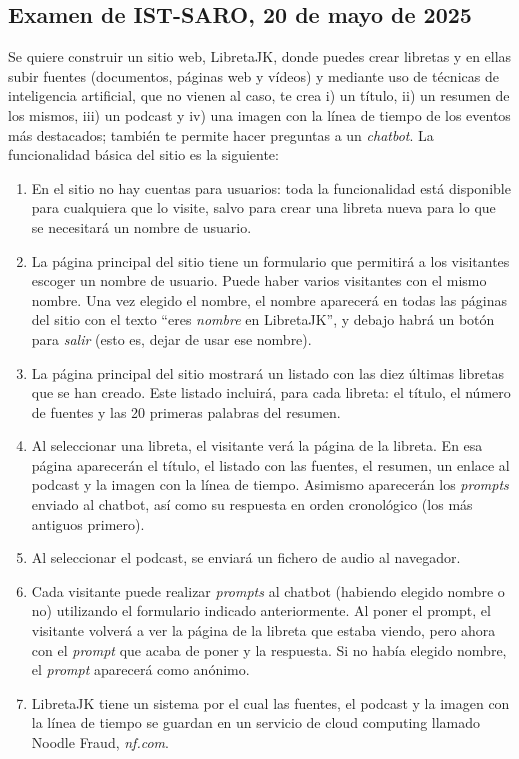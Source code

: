 
\subsection{Examen de IST-SARO, 20 de mayo de 2025}

Se quiere construir un sitio web, LibretaJK, donde puedes crear libretas y en ellas subir fuentes  (documentos, páginas web y vídeos) y mediante uso de técnicas de inteligencia artificial, que no vienen al caso, te crea i) un título, ii) un resumen de los mismos, iii) un podcast y iv) una imagen con la línea de tiempo de los eventos más destacados; también te permite hacer preguntas a un \emph{chatbot}. La funcionalidad básica del sitio es la siguiente:

\begin{enumerate}
  \item En el sitio no hay cuentas para usuarios: toda la funcionalidad está disponible para cualquiera que lo visite, salvo para crear una libreta nueva para lo que se necesitará un nombre de usuario.
  \item La página principal del sitio tiene un formulario que permitirá a los visitantes escoger un nombre de usuario. Puede haber varios visitantes con el mismo nombre. Una vez elegido el nombre, el nombre aparecerá en todas las páginas del sitio con el texto ``eres \emph{nombre} en LibretaJK'', y debajo habrá un botón para \emph{salir} (esto es, dejar de usar ese nombre).
  \item La página principal del sitio mostrará un listado con las diez últimas libretas que se han creado. Este listado incluirá, para cada libreta: el título, el número de fuentes y las 20 primeras palabras del resumen.
  \item Al seleccionar una libreta, el visitante verá la página de la libreta. En esa página aparecerán el título, el listado con las fuentes, el resumen, un enlace al podcast y la imagen con la línea de tiempo. Asimismo aparecerán los \emph{prompts} enviado al chatbot, así como su respuesta en orden cronológico (los más antiguos primero).
  \item Al seleccionar el podcast, se enviará un fichero de audio al navegador.
  \item Cada visitante puede realizar \emph{prompts} al chatbot (habiendo elegido nombre o no) utilizando el formulario indicado anteriormente. Al poner el prompt, el visitante volverá a ver la página de la libreta que estaba viendo, pero ahora con el \emph{prompt} que acaba de poner y la respuesta. Si no había elegido nombre, el \emph{prompt} aparecerá como anónimo.
  \item LibretaJK tiene un sistema por el cual las fuentes, el podcast y la imagen con la línea de tiempo se guardan en un servicio de cloud computing llamado Noodle Fraud, \emph{nf.com}.
\end{enumerate}


